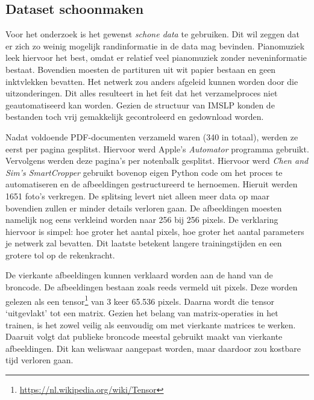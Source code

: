 \documentclass[dutch, twoside, a4paper, 10pt]{article}
\begin{document}
\subsection{Dataset schoonmaken} 
Voor het onderzoek is het gewenst \textit{schone data} te gebruiken. Dit wil zeggen dat er zich zo weinig mogelijk randinformatie in de data mag bevinden. Pianomuziek leek hiervoor het best, omdat er relatief veel pianomuziek zonder neveninformatie bestaat. Bovendien moesten de partituren uit wit papier bestaan en geen inktvlekken bevatten. Het netwerk zou anders afgeleid kunnen worden door die uitzonderingen. Dit alles resulteert in het feit dat het verzamelproces niet geautomatiseerd kan worden. Gezien de structuur van IMSLP konden de bestanden toch vrij gemakkelijk gecontroleerd en gedownload worden.
\par\bigskip\noindent
Nadat voldoende PDF-documenten verzameld waren (340 in totaal), werden ze eerst per pagina gesplitst. Hiervoor werd Apple's \textit{Automator} programma gebruikt. Vervolgens werden deze pagina's per notenbalk gesplitst. Hiervoor werd \textit{Chen and Sim's SmartCropper} gebruikt bovenop eigen Python code om het proces te automatiseren en de afbeeldingen gestructureerd te hernoemen. Hieruit werden 1651 foto's verkregen. De splitsing levert niet alleen meer data op maar bovendien zullen er minder details verloren gaan. De afbeeldingen moesten namelijk nog eens verkleind worden naar 256 bij 256 pixels. De verklaring hiervoor is simpel: hoe groter het aantal pixels, hoe groter het aantal parameters je netwerk zal bevatten. Dit laatste betekent langere trainingstijden en een grotere tol op de rekenkracht. 
\par\bigskip\noindent
De vierkante afbeeldingen kunnen verklaard worden aan de hand van de broncode. De afbeeldingen bestaan zoals reeds vermeld uit pixels. Deze worden gelezen als een tensor\footnote{\url{https://nl.wikipedia.org/wiki/Tensor}} van 3 keer 65.536 pixels. Daarna wordt die tensor `uitgevlakt' tot een matrix. Gezien het belang van matrix-operaties in het trainen, is het zowel veilig als eenvoudig om met vierkante matrices te werken. Daaruit volgt dat publieke broncode meestal gebruikt maakt van vierkante afbeeldingen. Dit kan weliswaar aangepast worden, maar daardoor zou kostbare tijd verloren gaan.
\end{document}
